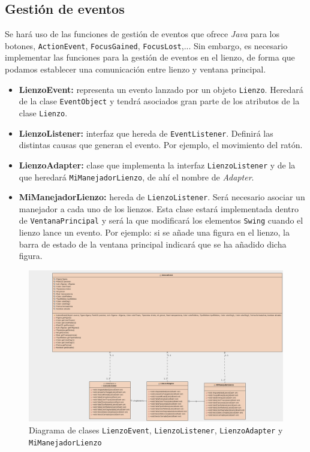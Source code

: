 \subsection{Gestión de eventos}
Se hará uso de las funciones de gestión de eventos que ofrece \textit{Java} para los botones, \texttt{ActionEvent}, \texttt{FocusGained}, \texttt{FocusLost},... Sin embargo, es necesario implementar las funciones para la gestión de eventos en el lienzo, de forma que podamos establecer una comunicación entre lienzo y ventana principal.
\begin{itemize}
\item{\textbf{LienzoEvent:} representa un evento lanzado por un objeto \texttt{Lienzo}. Heredará de la clase \texttt{EventObject} y tendrá asociados gran parte de los atributos de la clase \texttt{Lienzo}.}
\item{\textbf{LienzoListener:} interfaz que hereda de \texttt{EventListener}. Definirá las distintas causas que generan el evento. Por ejemplo, el movimiento del ratón.}
\item{\textbf{LienzoAdapter:} clase que implementa la interfaz \texttt{LienzoListener} y de la que heredará \texttt{MiManejadorLienzo}, de ahí el nombre de \textit{Adapter}.}
\item{\textbf{MiManejadorLienzo:} hereda de \texttt{LienzoListener}. Será necesario asociar un manejador a cada uno de los lienzos. Esta clase estará implementada dentro de \texttt{VentanaPrincipal} y será la que modificará los elementos \texttt{Swing} cuando el lienzo lance un evento. Por ejemplo: si se añade una figura en el lienzo, la barra de estado de la ventana principal indicará que se ha añadido dicha figura.}
\end{itemize}

\vskip0.3cm
\begin{figure}[H]
 \centering
  \includegraphics[width=1.1\textwidth]{diagramas/LienzoEvent.png}
 \caption{Diagrama de clases \texttt{LienzoEvent}, \texttt{LienzoListener}, \texttt{LienzoAdapter} y \texttt{MiManejadorLienzo}}
 \label{diseño}
 \end{figure}

